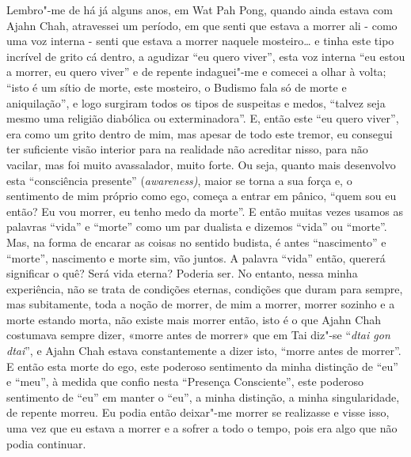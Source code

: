 Lembro"-me de há já alguns anos, em Wat Pah Pong, quando ainda estava com
Ajahn Chah, atravessei um período, em que senti que estava a morrer ali
- como uma voz interna - senti que estava a morrer naquele mosteiro\ldots{} e
tinha este tipo incrível de grito cá dentro, a agudizar ``eu quero
viver'', esta voz interna ``eu estou a morrer, eu quero viver'' e de
repente indaguei"-me e comecei a olhar à volta; ``isto é um sítio de
morte, este mosteiro, o Budismo fala só de morte e aniquilação'', e logo
surgiram todos os tipos de suspeitas e medos, ``talvez seja mesmo uma
religião diabólica ou exterminadora''. E, então este ``eu quero viver'',
era como um grito dentro de mim, mas apesar de todo este tremor, eu
consegui ter suficiente visão interior para na realidade não acreditar
nisso, para não vacilar, mas foi muito avassalador, muito forte. Ou
seja, quanto mais desenvolvo esta ``consciência presente''
(\emph{awareness)}, maior se torna a sua força e, o sentimento de mim
próprio como ego, começa a entrar em pânico, ``quem sou eu então? Eu vou
morrer, eu tenho medo da morte''. E então muitas vezes usamos as
palavras ``vida'' e ``morte'' como um par dualista e dizemos ``vida'' ou
``morte''. Mas, na forma de encarar as coisas no sentido budista, é
antes ``nascimento'' e ``morte'', nascimento e morte sim, vão juntos. A
palavra ``vida'' então, quererá significar o quê? Será vida eterna?
Poderia ser. No entanto, nessa minha experiência, não se trata de
condições eternas, condições que duram para sempre, mas subitamente,
toda a noção de morrer, de mim a morrer, morrer sozinho e a morte
estando morta, não existe mais morrer então, isto é o que Ajahn Chah
costumava sempre dizer, «morre antes de morrer» que em Tai diz"-se
``\emph{dtai gon dtai}'', e Ajahn Chah estava constantemente a dizer
isto, ``morre antes de morrer''. E então esta morte do ego, este
poderoso sentimento da minha distinção de ``eu'' e ``meu'', à medida que
confio nesta ``Presença Consciente'', este poderoso sentimento de ``eu''
em manter o ``eu'', a minha distinção, a minha singularidade, de repente
morreu. Eu podia então deixar"-me morrer se realizasse e visse isso, uma
vez que eu estava a morrer e a sofrer a todo o tempo, pois era algo que
não podia continuar.

